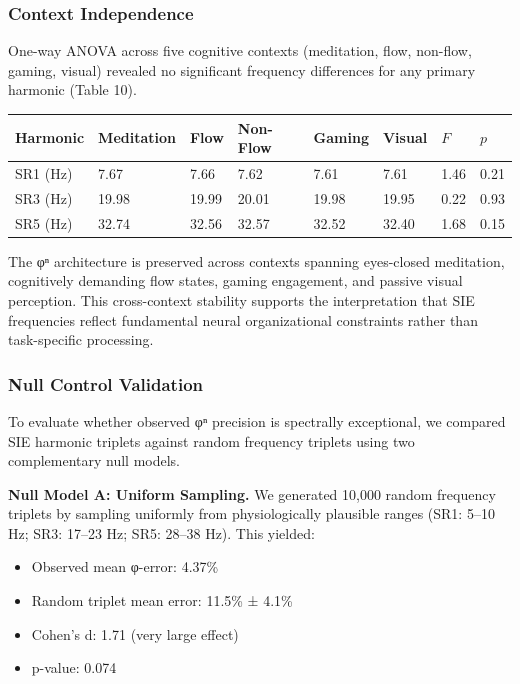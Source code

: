 \documentclass[11pt,a4paper]{article}
\begin{document}
\subsubsection{Context Independence}
One-way ANOVA across five cognitive contexts (meditation, flow, non-flow, gaming, visual) revealed no significant frequency differences for any primary harmonic (Table 10).
\begin{table}[H]
    \centering
    \begin{tabular}{llllllll}
        \toprule
        Harmonic & Meditation & Flow & Non-Flow & Gaming & Visual & $F$ & $p$ \\
        \midrule
        SR1 (Hz) & 7.67 & 7.66 & 7.62 & 7.61 & 7.61 & 1.46 & 0.21 \\
        SR3 (Hz) & 19.98 & 19.99 & 20.01 & 19.98 & 19.95 & 0.22 & 0.93 \\
        SR5 (Hz) & 32.74 & 32.56 & 32.57 & 32.52 & 32.40 & 1.68 & 0.15 \\
        \bottomrule
    \end{tabular}
\end{table}
The φⁿ architecture is preserved across contexts spanning eyes-closed meditation, cognitively demanding flow states, gaming engagement, and passive visual perception. This cross-context stability supports the interpretation that SIE frequencies reflect fundamental neural organizational constraints rather than task-specific processing.

\subsubsection{Null Control Validation}
To evaluate whether observed φⁿ precision is spectrally exceptional, we compared SIE harmonic triplets against random frequency triplets using two complementary null models.

\textbf{Null Model A: Uniform Sampling.} We generated 10,000 random frequency triplets by sampling uniformly from physiologically plausible ranges (SR1: 5–10 Hz; SR3: 17–23 Hz; SR5: 28–38 Hz). This yielded:
\begin{itemize}
\item Observed mean φ-error: 4.37\%
\item Random triplet mean error: 11.5\% ± 4.1\%
\item Cohen's d: 1.71 (very large effect)
\item p-value: 0.074
\end{itemize}
\end{document}
